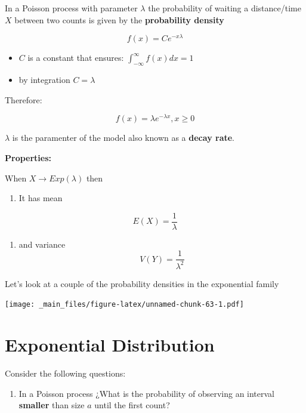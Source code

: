 \documentclass[
]{book}
\providecommand{\tightlist}{%
  \setlength{\itemsep}{0pt}\setlength{\parskip}{0pt}}
\begin{document}
In a Poisson process with parameter \(\lambda\) the probability of waiting a distance/time \(X\) between two counts is given by the \textbf{probability density}

\[f(x)= C e^{-x\lambda}\]

\begin{itemize}
\item
  \(C\) is a constant that ensures: \(\int_{-\infty}^{\infty} f(x) dx =1\)
\item
  by integration \(C=\lambda\)
\end{itemize}

Therefore:

\[f(x)=\lambda e^{-\lambda x}, x\geq 0\]

\(\lambda\) is the paramenter of the model also known as a \textbf{decay rate}.

\textbf{Properties:}

When \(X \rightarrow Exp(\lambda)\) then

\begin{enumerate}
\def\labelenumi{\arabic{enumi})}
\tightlist
\item
  It has mean
\end{enumerate}

\[E(X)=\frac{1}{\lambda}\]

\begin{enumerate}
\def\labelenumi{\arabic{enumi})}
\setcounter{enumi}{1}
\tightlist
\item
  and variance
  \[V(Y)=\frac{1}{\lambda^2}\]
\end{enumerate}

Let's look at a couple of the probability densities in the exponential family

\texttt{[image: \_main\_files/figure-latex/unnamed-chunk-63-1.pdf]}

\hypertarget{exponential-distribution}{%
\section{Exponential Distribution}\label{exponential-distribution}}

Consider the following questions:

\begin{enumerate}
\def\labelenumi{\arabic{enumi})}
\tightlist
\item
  In a Poisson process ¿What is the probability of observing an interval \textbf{smaller} than size \(a\) until the first count?
\end{enumerate}
\end{document}

